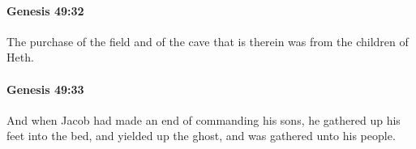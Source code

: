 		\paragraph{Genesis 49:32} %
			\label{GENESIS-49-32}

			The purchase of the field and of the cave that is therein was from the children of Heth.


		\paragraph{Genesis 49:33} %
			\label{GENESIS-49-33}

			And when Jacob had made an end of commanding his sons, he gathered up his feet into the bed, and yielded up the ghost, and was gathered unto his people.

